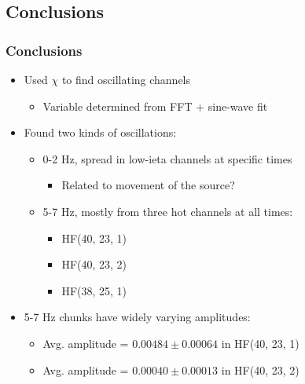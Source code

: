 \documentclass[bigger]{beamer}
\begin{document}
\subsection{Conclusions}
\label{sec-4-2}
\begin{frame}
\frametitle{Conclusions}
\label{sec-4-2-1}
\begin{itemize}

\item Used $\chi$ to find oscillating channels
\label{sec-4-2-1-1}%
\begin{itemize}

\item Variable determined from FFT + sine-wave fit
\label{sec-4-2-1-1-1}%
\end{itemize} %

\item Found two kinds of oscillations:
\label{sec-4-2-1-2}%
\begin{itemize}

\item 0-2 Hz, spread in low-ieta channels at specific times
\label{sec-4-2-1-2-1}%
\begin{itemize}

\item Related to movement of the source?
\label{sec-4-2-1-2-1-1}%
\end{itemize} %

\item 5-7 Hz, mostly from three hot channels at all times:
\label{sec-4-2-1-2-2}%
\begin{itemize}

\item HF(40, 23, 1)
\label{sec-4-2-1-2-2-1}%

\item HF(40, 23, 2)
\label{sec-4-2-1-2-2-2}%

\item HF(38, 25, 1)
\label{sec-4-2-1-2-2-3}%
\end{itemize} %
\end{itemize} %

\item 5-7 Hz chunks have widely varying amplitudes:
\label{sec-4-2-1-3}%
\begin{itemize}

\item Avg. amplitude = $0.00484 \pm 0.00064$ in HF(40, 23, 1)
\label{sec-4-2-1-3-1}%

\item Avg. amplitude = $0.00040 \pm 0.00013$ in HF(40, 23, 2)
\label{sec-4-2-1-3-2}%
\end{itemize} %
\end{itemize} %
\end{frame}
\end{document}
